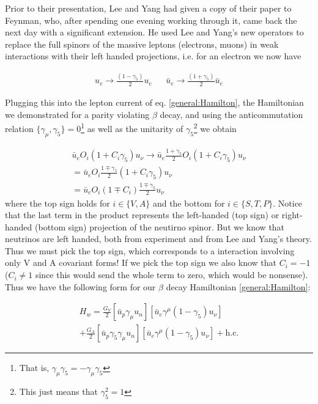 \documentclass[12pt]{book}
\begin{document}
Prior to their presentation, Lee and Yang had given a copy of their paper to Feynman, who, after spending one evening working through it, came back the next day with a significant extension. He used Lee and Yang's new operators to replace the full spinors of the massive leptons (electrons, muons) in weak interactions with their left handed projections, i.e. for an electron we now have

\begin{align}
 u_{e}\rightarrow \frac{\left(1-\gamma_{5}\right)}{2}u_{e} && \bar{u}_{e}\rightarrow \frac{\left(1+\gamma_{5}\right)}{2}\bar{u}_{e}
\end{align}

Plugging this into the lepton current of eq. \ref{general:Hamilton}, the Hamiltonian we demonstrated for a parity violating $\beta$ decay, and using the anticommutation relation $\{\gamma_{\mu},\gamma_{5}\}=0$\footnote{That is, $\gamma_{\mu}\gamma_{5}=-\gamma_{\mu}\gamma_{5}$} as well as the unitarity of $\gamma_{5}$\footnote{This just means that $\gamma_{5}^{2}=1$} we obtain

\begin{align}
 \bar{u}_{e}O_{i}\left(1+C_{i}\gamma_{5}\right)u_{\nu}\rightarrow \bar{u}_{e}\frac{1+\gamma_{5}}{2}O_{i}\left(1+C_{i}\gamma_{5}\right)u_{\nu} \\
=\bar{u}_{e}O_{i}\frac{1\mp\gamma_{5}}{2}\left(1+C_{i}\gamma_{5}\right)u_{\nu} \\
=\bar{u}_{e}O_{i}\left(1\mp C_{i}\right)\frac{1\mp\gamma_{5}}{2}u_{\nu}
\end{align}
where the top sign holds for $i\in\{V, A\}$ and the bottom for $i\in\{S, T, P\}$. Notice that the last term in the product represents the left-handed (top sign) or right-handed (bottom sign) projection of the neutirno spinor. But we know that neutrinos are left handed, both from experiment and from Lee and Yang's theory. Thus we must pick the top sign, which corresponds to a interaction involving only V and A covariant forms! If we pick the top sign we also know that $C_{i}=-1$ ($C_{i}\neq 1$ since this would send the whole term to zero, which would be nonsense). Thus we have the following form for our $\beta$ decay Hamiltonian \ref{general:Hamilton}:

\begin{multline}\label{VandA}
 H_{w}=\frac{G_{V}}{2}\left[\bar{u}_{p}\gamma_{\mu}u_{n}\right]\left[\bar{u}_{e}\gamma^{\mu}\left(1-\gamma_{5}\right)u_{\nu}\right] \\ + \frac{G_{A}}{2}\left[\bar{u}_{p}\gamma_{5}\gamma_{\mu}u_{n}\right]\left[\bar{u}_{e}\gamma^{\mu}\left(1-\gamma_{5}\right)u_{\nu}\right] +\text{h.c.}
\end{multline}
\end{document}
